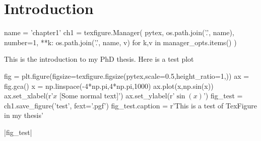 \chapter{Introduction}\label{ch:introduction}

\begin{pycode}[chapter1]
name = 'chapter1'
ch1 = texfigure.Manager(
    pytex,
    os.path.join('.', name),
    number=1,
    **{k: os.path.join('.', name, v) for k,v in manager_opts.items()}
)
\end{pycode}

This is the introduction to my PhD thesis. Here is a test plot

\begin{pycode}[chapter1]
fig = plt.figure(figsize=texfigure.figsize(pytex,scale=0.5,height_ratio=1,))
ax = fig.gca()
x = np.linspace(-4*np.pi,4*np.pi,1000)
ax.plot(x,np.sin(x))
ax.set_xlabel(r'$x$ [Some normal text]')
ax.set_ylabel(r'$\sin{(x)}$')
fig_test = ch1.save_figure('test', fext='.pgf')
fig_test.caption = r'This is a test of TexFigure in my thesis'
\end{pycode}
\py[chapter1]|fig_test|

